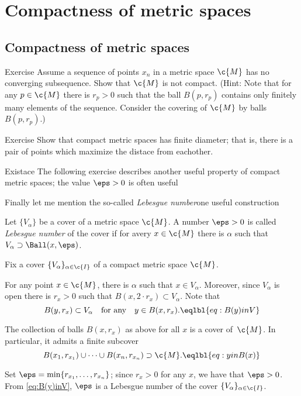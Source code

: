 \chapter{Compactness of metric spaces}

\section{Compactness of metric spaces}

\begin{thm}{Exercise}
Assume a sequence of points $x_n$ in a metric space $\c{M}$ has no converging subsequence.
Show that $\c{M}$ is not compact.
(Hint: Note that for any $p\in \c{M}$ there is $r_p>0$ such that the ball $B(p,r_p)$ contains only finitely many elements of the sequence. Consider the covering of $\c{M}$ by balls $B(p,r_p)$.)
\end{thm}


\begin{thm}{Exercise}
Show that compact metric spaces has finite diameter;
that is, there is a pair of points which maximize the distace from eachother.
\end{thm}


Existace 
The following exercise describes another useful property of compact metric spaces;
the value $\eps>0$ is often useful 

Finally let me mention the so-called \emph{Lebesgue number}one useful construction


Let $\{V_\alpha\}$ be a cover of a metric space $\c{M}$.
A number $\eps > 0$ is called \emph{Lebesgue number} of the cover if for avery $x\in\c{M}$ there is $\alpha$ such that $ V_\alpha\supset \Ball(x,\eps)$.



Fix a cover $\{V_\alpha\}_{\alpha\in\c{I}}$ of a compact metric space $\c{M}$.

For any point $x\in \c{M}$, there is $\alpha$ such that $x\in V_\alpha$.
Moreover, since $V_\alpha$ is open there is $r_x>0$ such that 
$B(x,2\cdot r_x)\subset V_\alpha$.
Note that 
\[B(y,r_x)\subset V_\alpha\quad\text{for any}\quad y\in B(x,r_x).
\eqlbl{eq:B(y)inV}\] 

The collection of balls $B(x,r_x)$ as above for all $x$
is a cover of~$\c{M}$.
In particular, it admits a finite subcover
\[B(x_1,r_{x_1})\cup\dots\cup B(x_n,r_{x_n})\supset \c{M}.\eqlbl{eq:yinB(x)}\]

Set $\eps=\min\{r_{x_1},\dots,r_{x_n}\}$;
since $r_x>0$ for any $x$, we have that $\eps>0$.
From \ref{eq:B(y)inV}, $\eps$ is a Lebesgue number of the cover $\{V_\alpha\}_{\alpha\in\c{I}}$.
\qeds


